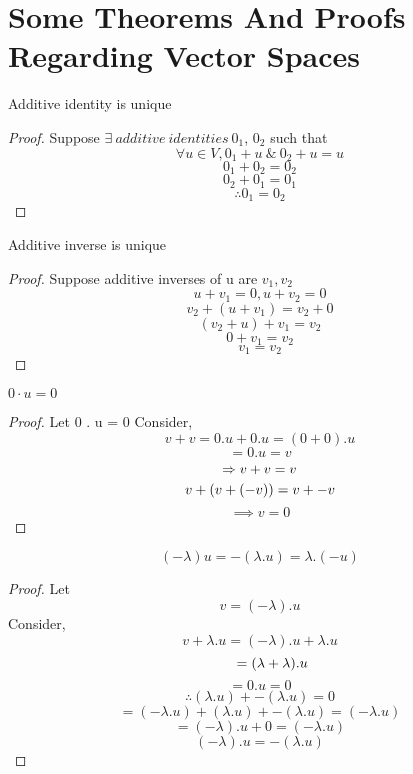 \documentclass{report}
\begin{document}
    \section{Some Theorems And Proofs Regarding Vector Spaces}
\begin{theorem}
    Additive identity is unique
\end{theorem}
    \begin{proof}
        Suppose $\exists \ additive \ identities \ 0_1$, $0_2$ such that
        \[\forall u \in V, 0_1 + u \ \& \ 0_2 + u = u\]
        \[0_1 + 0_2 = 0_2\]
        \[0_2 + 0_1 = 0_1\]
        \[\therefore 0_1 = 0_2\]
    \end{proof}
\begin{theorem}
    Additive inverse is unique
\end{theorem}
    \begin{proof}
        Suppose additive inverses of u are $v_1, v_2$
        \[u + v_1 = 0, u + v_2 = 0\]
        \[v_2 + (u+v_1) = v_2 + 0\]
        \[(v_2 + u) + v_1 = v_2\]
        \[0 + v_1 = v_2\]
        \[v_1 = v_2\]
        \end{proof}
\begin{theorem}
    $0\cdot u = 0$
\end{theorem}
\begin{proof}

   Let 0 . u = 0 
   Consider,
   \[
   v + v = 0.u + 0.u = (0+0).u
   \]
\[
	= 0.u = v
\]	
\[
	\implies v+v = v \\
\]
\[
       v+(v + (-v)) = v + -v \\
\]
\[
	\implies v = 0 
\]
\end{proof}
\begin{theorem}
	\[
	   (-\lambda)u = -(\lambda.u) = \lambda . (-u)
	\]
\end{theorem}
\begin{proof}
	Let \[
	   v = (-\lambda).u
	\]
	Consider,
	\begin{displaymath}
	v + \lambda. u = (-\lambda).u + \lambda. u
	\end{displaymath}
        \[
            \indent = (\lambda + \lambda).u
        \]
        \[
            = 0.u = 0
        \]	
        \[
            \therefore (\lambda .u) + -(\lambda.u) = 0
        \]
        \[
            =(-\lambda.u) + (\lambda.u) + -(\lambda.u) = (-\lambda.u)
        \]
        \[
            = (-\lambda).u + 0 = (-\lambda.u)  
        \]
        \[
            (-\lambda).u = -(\lambda.u)
        \]
\end{proof}
\end{document}
